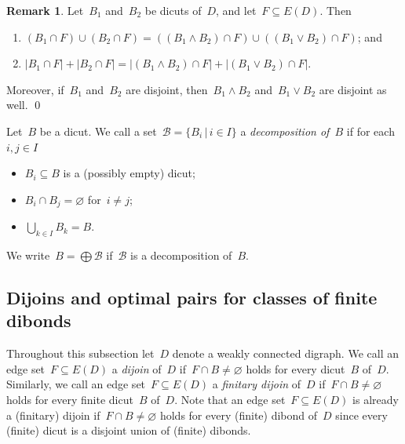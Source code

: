 \documentclass[reqno, 12pt]{amsart}
\numberwithin{equation}{section}
\numberwithin{figure}{section}
\let\emptyset=\varnothing
\theoremstyle{plain}
\theoremstyle{definition}
\newtheorem{remark}[thm]{Remark}
\newcommand{\abs}[1]{\ensuremath{{\lvert {#1} \rvert}}}
\begin{document}
\begin{remark}
    \label{rem:corners2}
    Let~$B_1$ and~$B_2$ be dicuts of~$D$, and let~${F \subseteq E(D)}$. 
    Then 
    \begin{enumerate}
        \item ${(B_1 \cap F) \cup (B_2 \cap F) = ((B_1 \wedge B_2) \cap F) \cup ((B_1 \vee B_2) \cap F)}$; and
        \item ${\abs{B_1 \cap F} + \abs{B_2 \cap F} = \abs{(B_1 \wedge B_2) \cap F} + \abs{(B_1 \vee B_2) \cap F}}$.
    \end{enumerate}

    Moreover, if~${B_1}$ and~${B_2}$ are disjoint, then~${B_1 \wedge B_2}$ and~${B_1 \vee B_2}$ are disjoint as well. \qed
\end{remark}

\vspace{0.2cm}

Let~$B$ be a dicut.
We call a set~${\mathcal{B} = \{ B_i \, | \, i \in I \}}$ a \emph{decomposition of~$B$} if for each~${i, j \in I}$
\begin{itemize}
    \item ${B_i \subseteq B}$ is a (possibly empty) dicut; 
    \item ${B_i \cap B_j = \emptyset}$ for~${i \neq j}$; 
    \item ${\bigcup_{k \in I} B_k = B}$.
\end{itemize}
We write~${B = \bigoplus \mathcal{B}}$ if~${\mathcal{B}}$ is a decomposition of~$B$. 




\subsection{Dijoins and optimal pairs for classes of finite dibonds}

Throughout this subsection let~$D$ denote a weakly connected digraph.
We call an edge set~${F \subseteq E(D)}$ a \emph{dijoin} of~$D$ if~${F \cap B \neq \emptyset}$ holds for every 
dicut~$B$ of~$D$.
Similarly, we call an edge set~${F \subseteq E(D)}$ a \emph{finitary dijoin} of~$D$ if~${F \cap B \neq \emptyset}$ holds for every 
finite dicut~$B$ of~$D$. 
Note that an edge set~${F \subseteq E(D)}$ is already a (finitary) dijoin if~${F \cap B \neq \emptyset}$ holds for every (finite) dibond of~$D$ since every (finite) dicut is a disjoint union of (finite) dibonds.

\vspace{0.2cm}
\end{document}
